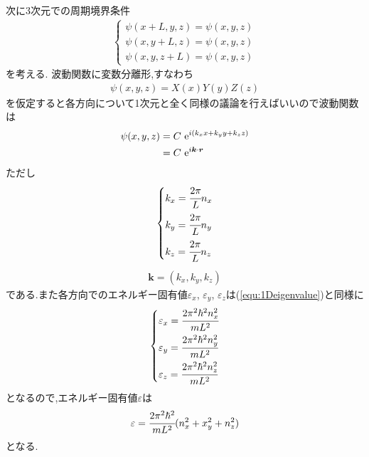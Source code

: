 次に3次元での周期境界条件
\begin{align}
  \begin{cases}
    \psi(x+L,y,z)=\psi(x,y,z)\\
    \psi(x,y+L,z)=\psi(x,y,z)\\
    \psi(x,y,z+L)=\psi(x,y,z)
  \end{cases}
\end{align}
を考える.
波動関数に変数分離形,すなわち
\begin{align}
  \psi(x,y,z)=X(x)Y(y)Z(z)
\end{align}
を仮定すると各方向について1次元と全く同様の議論を行えばいいので波動関数は
\begin{align}
  \psi(x,y,z)&=C\ {\rm e}^{i(k_xx+k_yy+k_zz)}\\
  &=C\ {\rm e}^{i{\bm k}\cdot\bm{r}}
\end{align}
ただし
\begin{align}
  \begin{dcases}
    k_x=\cfrac{2\pi}{L}n_x\\
    k_y=\cfrac{2\pi}{L}n_y\\
    k_z=\cfrac{2\pi}{L}n_z\\
  \end{dcases}
\end{align}
\begin{align}
  \bm{k}=(k_x,k_y,k_z)
\end{align}
である.また各方向でのエネルギー固有値$\varepsilon_x$, $\varepsilon_y$, $\varepsilon_z$は(\ref{equ:1Deigenvalue})と同様に
\begin{align}
  \begin{dcases}
    \varepsilon_x=\cfrac{2\pi^2\hbar^2n_x^2}{mL^2}\\
    \varepsilon_y=\cfrac{2\pi^2\hbar^2n_y^2}{mL^2}\\
    \varepsilon_z=\cfrac{2\pi^2\hbar^2n_z^2}{mL^2}\\
  \end{dcases}
\end{align}
となるので,エネルギー固有値$\varepsilon$は
\begin{align}
  \varepsilon=\cfrac{2\pi^2\hbar^2}{mL^2}(n_x^2+x_y^2+n_z^2)
\end{align}
となる.